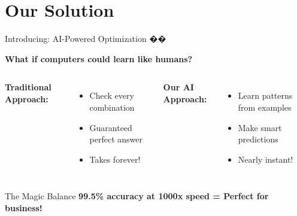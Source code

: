 \documentclass[aspectratio=169]{beamer}
\begin{document}
\section{Our Solution}

\begin{frame}{Introducing: AI-Powered Optimization ��}
\begin{center}
\Large \textbf{What if computers could learn like humans?}
\end{center}

\vspace{0.5cm}

\begin{columns}
\textbf{Traditional Approach:}
\begin{itemize}
    \item Check every combination
    \item Guaranteed perfect answer
    \item \textcolor{aired}{Takes forever!}
\end{itemize}

\vspace{0.3cm}

\textbf{Our AI Approach:}
\begin{itemize}
    \item Learn patterns from examples
    \item Make smart predictions
    \item \textcolor{aigreen}{Nearly instant!}
\end{itemize}

\vspace{0.3cm}
\end{columns}

\vspace{0.5cm}
\begin{block}{The Magic Balance}
\textbf{99.5\% accuracy at 1000x speed = Perfect for business!}
\end{block}
\end{frame}
\end{document}

